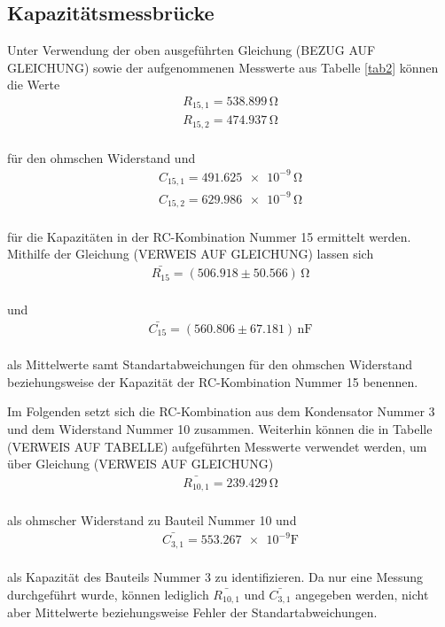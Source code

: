 \subsection{Kapazitätsmessbrücke}

Unter Verwendung der oben ausgeführten Gleichung (BEZUG AUF GLEICHUNG) sowie der aufgenommenen
Messwerte aus Tabelle \ref{tab2} können die Werte 
\begin{align}
R_{15,1} = 538.899\,\si{\ohm} \nonumber \\
R_{15,2} = 474.937\,\si{\ohm} \nonumber  
\end{align}
\\
für den ohmschen Widerstand und
\begin{align}
C_{15,1} = \num{491.625e-9}\,\si{\ohm} \nonumber \\
C_{15,2} = \num{629.986e-9}\,\si{\ohm} \nonumber 
\end{align}
\\
für die Kapazitäten in der RC-Kombination Nummer 15 ermittelt werden. Mithilfe der Gleichung (VERWEIS AUF GLEICHUNG)
lassen sich 
\begin{align}
\bar{R_{15}} = (506.918 \pm 50.566)\, \si{\ohm} \nonumber 
\end{align}
\\
und
\begin{align}
\bar{C_{15}} = (560.806 \pm 67.181)\, \si{\nano\farad} \nonumber 
\end{align}
\\
als Mittelwerte samt Standartabweichungen für den ohmschen Widerstand beziehungsweise der
Kapazität der RC-Kombination Nummer 15 benennen.



Im Folgenden setzt sich die RC-Kombination aus dem Kondensator Nummer 3 und dem Widerstand Nummer 10 zusammen. Weiterhin 
können die in Tabelle (VERWEIS AUF TABELLE) aufgeführten Messwerte verwendet werden, um über Gleichung
(VERWEIS AUF GLEICHUNG) 
\begin{align}
\bar{R_{10,1}} = 239.429\, \si{\ohm} \nonumber
\end{align}
\\
als ohmscher Widerstand zu Bauteil Nummer 10 und
\begin{align}
\bar{C_{3,1}} = \num{553.267e-9} \si{\farad} \nonumber
\end{align}
\\
als Kapazität des Bauteils Nummer 3 zu identifizieren. Da nur eine Messung durchgeführt wurde, können lediglich $\bar{R_{10,1}}$
und $\bar{C_{3,1}}$ angegeben werden, nicht aber Mittelwerte beziehungsweise Fehler der Standartabweichungen.


